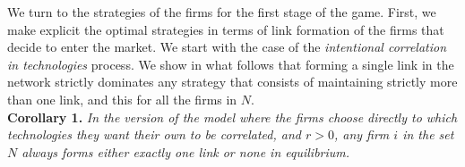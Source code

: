 \documentclass[11pt]{article}
\begin{document}
\indent We turn to the strategies of the firms for the first stage of the game. First, we make explicit the optimal strategies in terms of link formation of the firms that decide to enter the market. We start with the case of the \textit{intentional correlation in technologies} process. We show in what follows that forming a single link in the network strictly dominates any strategy that consists of maintaining strictly more than one link, and this for all the firms in $N$. \\

\textbf{Corollary 1.} \textit{In the version of the model where the firms choose directly to which technologies they want their own to be correlated, and $r>0$, any firm $i$ in the set $N$ always forms either exactly one link or none in equilibrium. }\\
\end{document}
